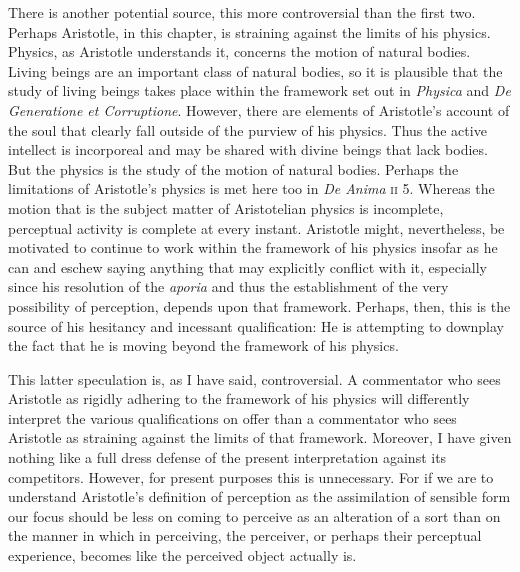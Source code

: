 There is another potential source, this more controversial than the first two. Perhaps Aristotle, in this chapter, is straining against the limits of his physics. Physics, as Aristotle understands it, concerns the motion of natural bodies. Living beings are an important class of natural bodies, so it is plausible that the study of living beings takes place within the framework set out in \emph{Physica} and \emph{De Generatione et Corruptione}. However, there are elements of Aristotle's account of the soul that clearly fall outside of the purview of his physics. Thus the active intellect is incorporeal and may be shared with divine beings that lack bodies. But the physics is the study of the motion of natural bodies. Perhaps the limitations of Aristotle's physics is met here too in \emph{De Anima} \textsc{ii} 5. Whereas the motion that is the subject matter of Aristotelian physics is incomplete, perceptual activity is complete at every instant. Aristotle might, nevertheless, be motivated to continue to work within the framework of his physics insofar as he can and eschew saying anything that may explicitly conflict with it, especially since his resolution of the \emph{aporia} and thus the establishment of the very possibility of perception, depends upon that framework. Perhaps, then, this is the source of his hesitancy and incessant qualification: He is attempting to downplay the fact that he is moving beyond the framework of his physics. 

This latter speculation is, as I have said, controversial. A commentator who sees Aristotle as rigidly adhering to the framework of his physics will differently interpret the various qualifications on offer than a commentator who sees Aristotle as straining against the limits of that framework. Moreover, I have given nothing like a full dress defense of the present interpretation against its competitors. However, for present purposes this is unnecessary. For if we are to understand Aristotle's definition of perception as the assimilation of sensible form our focus should be less on coming to perceive as an alteration of a sort than on the manner in which in perceiving, the perceiver, or perhaps their perceptual experience, becomes like the perceived object actually is.


